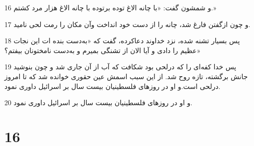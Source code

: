 \par 16 و شمشون گفت: «با چانه الاغ توده برتوده با چانه الاغ هزار مرد کشتم.»
\par 17 و چون ازگفتن فارغ شد، چانه را از دست خود انداخت وآن مکان را رمت لحی نامید.
\par 18 پس بسیار تشنه شده، نزد خداوند دعاکرده، گفت که «به‌دست بنده ات این نجات عظیم را دادی و آیا الان از تشنگی بمیرم و به‌دست نامختونان بیفتم؟»
\par 19 پس خدا کفه‌ای را که درلحی بود شکافت که آب از آن جاری شد و چون بنوشید جانش برگشته، تازه روح شد. از این سبب اسمش عین حقوری خوانده شد که تا امروز درلحی است.و او در روزهای فلسطینیان بیست سال بر اسرائیل داوری نمود.
\par 20 و او در روزهای فلسطینیان بیست سال بر اسرائیل داوری نمود.
 
\chapter{16}

